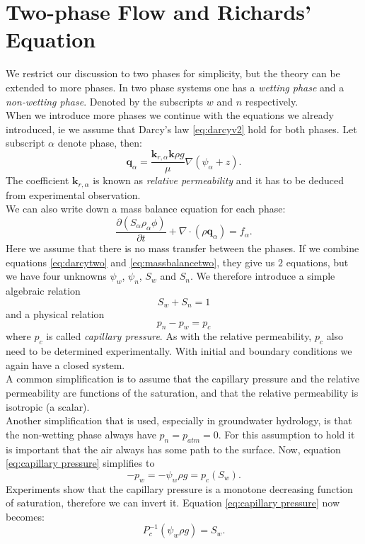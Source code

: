 \documentclass[../Main/main.tex]{subfiles}
\begin{document}
\section*{Two-phase Flow and Richards' Equation}
We restrict our discussion to two phases for simplicity, but the theory can be extended to more phases. In two phase systems one has a \emph{wetting phase} and a \emph{non-wetting phase}. Denoted by the subscripts $w$ and $n$ respectively. \\
When we introduce more phases we continue with the equations we already introduced, ie we assume that Darcy's law  \eqref{eq:darcyv2} hold for both phases. Let subscript $\alpha$ denote phase, then:
\begin{equation}\label{eq:darcytwo}
	\bm{q}_{\alpha} = \frac{\bm{k}_{r,\alpha}\bm{k}\rho g}{\mu}\nabla(\psi_{\alpha} + z).
\end{equation}
The coefficient $\bm{k}_{r,\alpha}$ is known as \emph{relative permeability} and it has to be deduced from experimental observation. \\ We can also write down a mass balance equation for each phase:
\begin{equation}\label{eq:massbalancetwo}
	\frac{\partial (S_{\alpha}\rho_{\alpha} \phi) }{\partial t} + \nabla \cdot (\rho \bm{q}_{\alpha}) = f_{\alpha}.
\end{equation}
Here we assume that there is no mass transfer between the phases.
If we combine equations \eqref{eq:darcytwo} and \eqref{eq:massbalancetwo}, they give us $2$ equations, but we have four unknowns $\psi_w$, $\psi_n$, $S_w$ and $S_n$. We therefore introduce a simple algebraic relation
\begin{equation*}
	S_w + S_n = 1
\end{equation*}
and a physical relation
\begin{equation}\label{eq:capillary pressure}
	p_n-p_w = p_c
\end{equation}
where $p_c$ is called \emph{capillary pressure}. As with the relative permeability, $p_c$ also need to be determined experimentally.
With initial and boundary conditions we again have a closed system.\\
A common simplification is to assume that the capillary pressure and the relative permeability are functions of the saturation, and that the relative permeability is isotropic (a scalar). \\
Another simplification that is used, especially in groundwater hydrology, is that the non-wetting phase always have $p_n = p_{atm}=0$. For this assumption to hold it is important that the air always has some path to the surface. Now, equation \eqref{eq:capillary pressure} simplifies to
\begin{equation*}\label{eq:groundwater capillary pressure}
	-p_w = -\psi_w\rho g = p_c(S_w).
\end{equation*}
Experiments show that the capillary pressure is a monotone decreasing function of saturation, therefore we can invert it. Equation \eqref{eq:capillary pressure} now becomes:
\begin{equation*}
	P_c^{-1}(\psi_w\rho g) = S_w.
\end{equation*}
\end{document}
